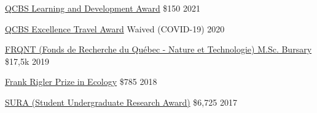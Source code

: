 \vspace{5pt}

\begin{cvhonors}

  \cvhonor
    {\href{https://qcbs.ca/student-grants/learning-development-award-leada/}{QCBS Learning and Development Award}} %
    {} %
    {\$150} %
    {2021} %

  \cvhonor
    {\href{https://qcbs.ca/student-grants/excellence-awards/}{QCBS Excellence Travel Award}} %
    {} %
    {Waived (COVID-19)} %
    {2020} %

  \cvhonor
    {\href{https://frq.gouv.qc.ca/en/program/programs-of-scholarships-of-2nd-and-3rd-cycles-b1-b2-a2-21-22/}{FRQNT (Fonds de Recherche du Québec - Nature et Technologie) M.Sc. Bursary}} %
    {} %
    {\$17,5k} %
    {2019} %

  \cvhonor
    {\href{http://www.canadian-universities.net/Scholarships/F/Frank-Rigler-Prize-in-Ecology.html}{Frank Rigler Prize in Ecology}} %
    {} %
    {\$785} %
    {2018} %

  \cvhonor
    {\href{https://www.mcgill.ca/science/research/undergraduate-research/sura}{SURA (Student Undergraduate Research Award)}} %
    {} %
    {\$6,725} %
    {2017} %
    

\end{cvhonors}
\vspace{20pt}